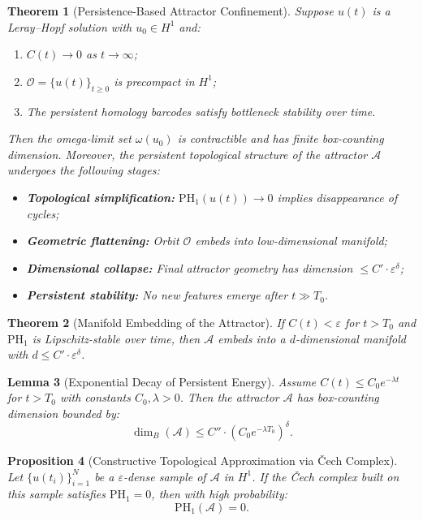 \documentclass[11pt]{article}
\newtheorem{theorem}{Theorem}[section]
\newtheorem{lemma}[theorem]{Lemma}
\newtheorem{proposition}[theorem]{Proposition}
\theoremstyle{definition}
\begin{document}
\begin{theorem}[Persistence-Based Attractor Confinement]
\label{thm:attractor-confinement}
Suppose $u(t)$ is a Leray--Hopf solution with $u_0 \in H^1$ and:
\begin{enumerate}
  \item $C(t) \to 0$ as $t \to \infty$;
  \item $\mathcal{O} = \{ u(t) \}_{t \ge 0}$ is precompact in $H^1$;
  \item The persistent homology barcodes satisfy bottleneck stability over time.
\end{enumerate}
Then the omega-limit set $\omega(u_0)$ is contractible and has finite box-counting dimension. Moreover, the persistent topological structure of the attractor $\mathcal{A}$ undergoes the following stages:
\begin{itemize}
  \item \textbf{Topological simplification:} $\mathrm{PH}_1(u(t)) \to 0$ implies disappearance of cycles;
  \item \textbf{Geometric flattening:} Orbit $\mathcal{O}$ embeds into low-dimensional manifold;
  \item \textbf{Dimensional collapse:} Final attractor geometry has dimension $\le C' \cdot \varepsilon^{\delta}$;
  \item \textbf{Persistent stability:} No new features emerge after $t \gg T_0$.
\end{itemize}
\end{theorem}

\begin{theorem}[Manifold Embedding of the Attractor]
If $C(t) < \varepsilon$ for $t > T_0$ and $\mathrm{PH}_1$ is Lipschitz-stable over time, then $\mathcal{A}$ embeds into a $d$-dimensional manifold with $d \le C' \cdot \varepsilon^\delta$.
\end{theorem}

\begin{lemma}[Exponential Decay of Persistent Energy]
\label{lem:exp-Ct}
Assume $C(t) \le C_0 e^{-\lambda t}$ for $t > T_0$ with constants $C_0, \lambda > 0$. Then the attractor $\mathcal{A}$ has box-counting dimension bounded by:
\[
\dim_B(\mathcal{A}) \le C'' \cdot (C_0 e^{-\lambda T_0})^\delta.
\]
\end{lemma}

\begin{proposition}[Constructive Topological Approximation via \v{C}ech Complex]
Let $\{u(t_i)\}_{i=1}^N$ be a $\varepsilon$-dense sample of $\mathcal{A}$ in $H^1$. If the \v{C}ech complex built on this sample satisfies $\mathrm{PH}_1 = 0$, then with high probability:
\[
\mathrm{PH}_1(\mathcal{A}) = 0.
\]
\end{proposition}
\end{document}
